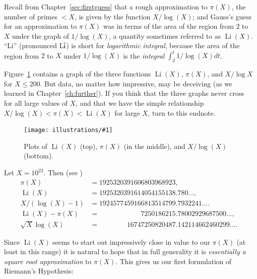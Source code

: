 \documentclass[openany]{book}
\DeclareMathOperator{\Li}{Li}
\newcommand{\ill}[3]{%
   \begin{figure}[H]%
   \vspace{-2ex}
   \centering%
   \texttt{[image: illustrations/\#1]}%
   \caption{#3}%
   \vspace{-2ex}
    \end{figure}}
\theoremstyle{plain}
\theoremstyle{definition}
\begin{document}
 

Recall from Chapter~\ref{sec:firstguess} that a rough approximation to
$\pi(X)$, the number of primes $< X$, is given by the function
$X/\log(X)$; and Gauss's guess for an approximation to $\pi(X)$ was in
terms of the area of the region from $2$ to $X$ under the graph of
$1/\log(X)$, a quantity sometimes referred to as $\Li(X)$. 
``Li'' (pronounced L$\overline{\rm i}$) is short for {\em logarithmic integral},
because the area of the region from $2$ to $X$ under $1/\log(X)$
is the {\em integral} $\int_2^t 1/\log(X) dt$.

Figure~\ref{fig:threeplots} contains a graph of the three functions
$\Li(X)$, $\pi(X)$, and $X/\log X$ for $X\leq 200$.
But data, no matter how impressive, may be deceiving (as we learned in 
Chapter~\ref{ch:further}). If you think
that  the three graphs  never cross for all large values of $X$,  and
that we have the simple relationship  $X/\log(X) < \pi(X) < \Li(X)$ for
large $X$, turn to this endnote.

 
\ill{three_plots}{.9}{Plots of $\Li(X)$ (top), $\pi(X)$ (in the middle), and $X/\log(X)$ (bottom).\label{fig:threeplots}}
 
Let $X=10^{23}$.  Then \label{pili_vals} (see )
\begin{align*}
  \pi(X) &= 1925320391606803968923,\\
  \Li(X) &= 1925320391614054155138.780\ldots, \\
  X/(\log(X)-1)  &=  1924577459166813514799.7932241\ldots.\\
  \Li(X) - \pi(X) &= \hspace{6em}7250186215.78002929687500\ldots, \\
  \sqrt{X}\log(X) &= \hspace{4em}16747250820487.142114662460299 \ldots.
\end{align*}


Since $\Li(X)$ seems to start out impressively close in value to our
$\pi(X)$ (at least in this range) it is natural to hope that in full
generality it is {\it essentially a square root approximation} to
$\pi(X)$.  This gives us our first formulation of Riemann's
Hypothesis:
\end{document}
